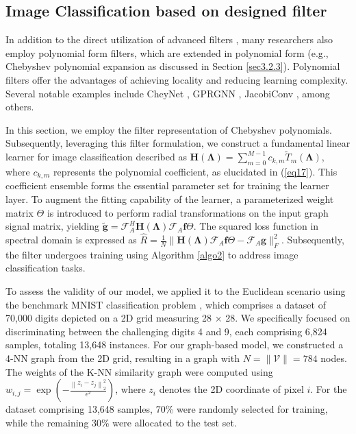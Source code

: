 \documentclass[lettersize,journal]{IEEEtran}
\begin{document}
\subsection{Image Classification based on designed filter}
In addition to the direct utilization of advanced filters \cite{bruna2013spectral, liao2019lanczosnet}, many researchers also employ polynomial form filters, which are extended in polynomial form (e.g., Chebyshev polynomial expansion as discussed in Section \ref{sec3.2.3}). Polynomial filters offer the advantages of achieving locality and reducing learning complexity. Several notable examples include CheyNet \cite{defferrard2016convolutional}, GPRGNN \cite{chien2020adaptive}, JacobiConv \cite{wang2022powerful}, among others.

In this section, we employ the filter representation of Chebyshev polynomials. Subsequently, leveraging this filter formulation, we construct a fundamental linear learner for image classification described as $\mathbf{H(\Lambda)}
	=\sum_{m=0}^{M-1}c_{k,m}\tilde{T}_m(\boldsymbol{\Lambda})$,
where $c_{k,m}$ represents the polynomial coefficient, as elucidated in (\ref{eq17}). This coefficient ensemble forms the essential parameter set for training the learner layer. 
To augment the fitting capability of the learner, a parameterized weight matrix $\Theta$ is introduced to perform radial transformations on the input graph signal matrix, yielding 
$\widetilde{\mathbf{g}} = \mathcal{F}_{A}^H \mathbf{H}(\boldsymbol{\Lambda}) \mathcal{F}_{A}\mathbf{f} \Theta$.
The squared loss function in spectral domain is expressed as
$\hat{R} = \frac{1}{N} \|\mathbf{H}(\boldsymbol{\Lambda}) \mathcal{F}_{A} \mathbf{f}\Theta -  \mathcal{F}_{A}\mathbf{g}\|_F^2$.
Subsequently, the filter undergoes training using Algorithm \ref{algo2} to address image classification tasks.

To assess the validity of our model, we applied it to the Euclidean scenario using the benchmark MNIST classification problem \cite{defferrard2016convolutional}, which comprises a dataset of 70,000 digits depicted on a 2D grid measuring 28 × 28. We specifically focused on discriminating between the challenging digits 4 and 9, each comprising 6,824 samples, totaling 13,648 instances.
For our graph-based model, we constructed a 4-NN graph from the 2D grid, resulting in a graph with $N = \|\mathcal{V}\| = 784$ nodes. The weights of the K-NN similarity graph were computed using 
$w_{i,j}=\exp \left(-\frac{\left\|z_i-z_j\right\|_2^2}{\epsilon^2}\right)$,
where $z_i$ denotes the 2D coordinate of pixel $i$.
For the dataset comprising 13,648 samples, 70\% were randomly selected for training, while the remaining 30\% were allocated to the test set. 
\end{document}
